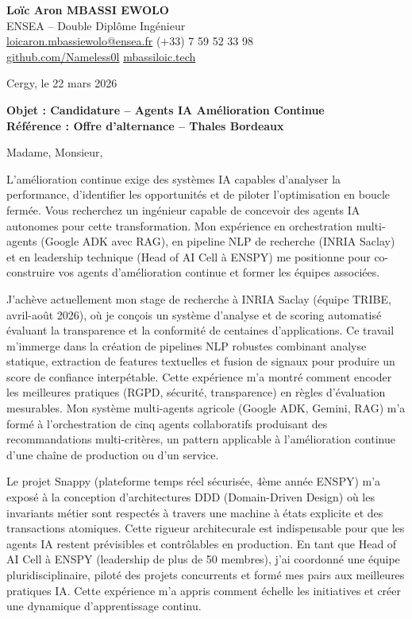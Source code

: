 \documentclass[a4paper,11pt]{article}
\begin{document}
\noindent
\textbf{Loïc Aron MBASSI EWOLO} \\
ENSEA -- Double Diplôme Ingénieur \\
\href{mailto:loicaron.mbassiewolo@ensea.fr}{loicaron.mbassiewolo@ensea.fr} \quad (+33) 7 59 52 33 98 \\
\href{https://github.com/Nameless0l}{github.com/Nameless0l} \quad \href{https://mbassiloic.tech}{mbassiloic.tech}

\vspace{1em}
\noindent Cergy, le 22 mars 2026

\vspace{1em}
\noindent
\textbf{Objet : Candidature -- Agents IA Amélioration Continue} \\
\textbf{Référence : Offre d'alternance -- Thales Bordeaux}

\vspace{1.5em}
\noindent Madame, Monsieur,

\vspace{0.8em}
L'amélioration continue exige des systèmes IA capables d'analyser la performance, d'identifier les opportunités et de piloter l'optimisation en boucle fermée. Vous recherchez un ingénieur capable de concevoir des agents IA autonomes pour cette transformation. Mon expérience en orchestration multi-agents (Google ADK avec RAG), en pipeline NLP de recherche (INRIA Saclay) et en leadership technique (Head of AI Cell à ENSPY) me positionne pour co-construire vos agents d'amélioration continue et former les équipes associées.

\vspace{0.8em}
J'achève actuellement mon stage de recherche à INRIA Saclay (équipe TRIBE, avril-août 2026), où je conçois un système d'analyse et de scoring automatisé évaluant la transparence et la conformité de centaines d'applications. Ce travail m'immerge dans la création de pipelines NLP robustes combinant analyse statique, extraction de features textuelles et fusion de signaux pour produire un score de confiance interpétable. Cette expérience m'a montré comment encoder les meilleures pratiques (RGPD, sécurité, transparence) en règles d'évaluation mesurables. Mon système multi-agents agricole (Google ADK, Gemini, RAG) m'a formé à l'orchestration de cinq agents collaboratifs produisant des recommandations multi-critères, un pattern applicable à l'amélioration continue d'une chaîne de production ou d'un service.

\vspace{0.8em}
Le projet Snappy (plateforme temps réel sécurisée, 4ème année ENSPY) m'a exposé à la conception d'architectures DDD (Domain-Driven Design) où les invariants métier sont respectés à travers une machine à états explicite et des transactions atomiques. Cette rigueur architecurale est indispensable pour que les agents IA restent prévisibles et contrôlables en production. En tant que Head of AI Cell à ENSPY (leadership de plus de 50 membres), j'ai coordonné une équipe pluridisciplinaire, piloté des projets concurrents et formé mes pairs aux meilleures pratiques IA. Cette expérience m'a appris comment échelle les initiatives et créer une dynamique d'apprentissage continu.
\end{document}
